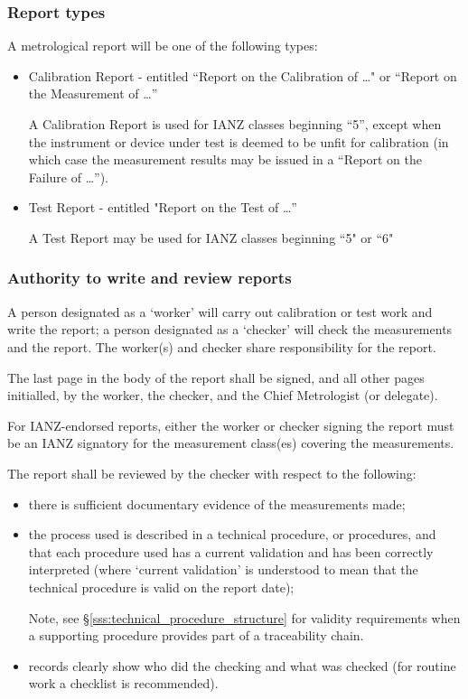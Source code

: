 \subsubsection{Report types}
A metrological report will be one of the following types:
\begin{itemize}
\item Calibration Report - entitled ``Report on the Calibration of \ldots" or ``Report on the Measurement of \ldots'' 

A Calibration Report is used for IANZ classes beginning ``5'', except when the instrument or device under test is deemed to be unfit for calibration (in which case the measurement results may be issued in a ``Report on the Failure of \ldots'').

\item Test Report - entitled "Report on the Test of \ldots''  

A Test Report may be used for IANZ classes beginning ``5" or ``6"
\end{itemize} 

\subsubsection{Authority to write and review reports}
A person designated as a ‘worker’ will carry out calibration or test work and write the report; a person designated as a ‘checker’ will check the measurements and the report. The worker(s) and checker share responsibility for the report.

The last page in the body of the report shall be signed, and all other pages initialled, by the worker, the checker, and the Chief Metrologist (or delegate). 

For IANZ-endorsed reports, either the worker or checker signing the report must be an IANZ signatory for the measurement class(es) covering the measurements.

The report shall be reviewed by the checker with respect to the following: 
\begin{itemize}
\item there is sufficient documentary evidence of the measurements made;
\item the process used is described in a technical procedure, or procedures, and that each procedure used has a current validation and has been correctly interpreted (where ‘current validation' is understood to mean that the technical procedure is valid on the report date);

Note, see \S\ref{sss:technical_procedure_structure} for validity requirements when a supporting procedure provides part of a traceability chain.

\item records clearly show who did the checking and what was checked (for routine work a checklist is recommended).
\end{itemize} 

